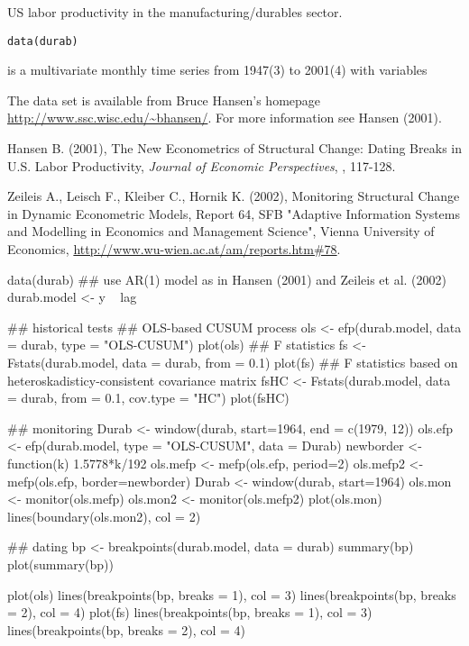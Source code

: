 \begin{Description}\relax
US labor productivity in the manufacturing/durables sector.\end{Description}
\begin{Usage}
\begin{verbatim}data(durab)\end{verbatim}
\end{Usage}
\begin{Format}\relax
{} is a multivariate monthly time series from 1947(3)
to 2001(4) with variables
\end{Format}
\begin{Source}\relax
The data set is available from Bruce Hansen's homepage
\url{http://www.ssc.wisc.edu/~bhansen/}. For more information
see Hansen (2001).\end{Source}
\begin{References}\relax
Hansen B. (2001), The New Econometrics of Structural Change:
Dating Breaks in U.S. Labor Productivity,
\emph{Journal of Economic Perspectives}, , 117-128.

Zeileis A., Leisch F., Kleiber C., Hornik K. (2002), Monitoring
Structural Change in Dynamic Econometric Models,
Report 64, SFB "Adaptive Information Systems and Modelling in Economics
and Management Science", Vienna University of Economics,
\url{http://www.wu-wien.ac.at/am/reports.htm#78}.\end{References}
\begin{Examples}
\begin{ExampleCode}
data(durab)
## use AR(1) model as in Hansen (2001) and Zeileis et al. (2002)
durab.model <- y ~ lag

## historical tests
## OLS-based CUSUM process
ols <- efp(durab.model, data = durab, type = "OLS-CUSUM")
plot(ols)
## F statistics
fs <- Fstats(durab.model, data = durab, from = 0.1)
plot(fs)
## F statistics based on heteroskadisticy-consistent covariance matrix
fsHC <- Fstats(durab.model, data = durab, from = 0.1, cov.type = "HC")
plot(fsHC)

## monitoring
Durab <- window(durab, start=1964, end = c(1979, 12))
ols.efp <- efp(durab.model, type = "OLS-CUSUM", data = Durab)
newborder <- function(k) 1.5778*k/192
ols.mefp <- mefp(ols.efp, period=2)
ols.mefp2 <- mefp(ols.efp, border=newborder)
Durab <- window(durab, start=1964)
ols.mon <- monitor(ols.mefp)
ols.mon2 <- monitor(ols.mefp2)
plot(ols.mon)
lines(boundary(ols.mon2), col = 2)

## dating
bp <- breakpoints(durab.model, data = durab)
summary(bp)
plot(summary(bp))

plot(ols)
lines(breakpoints(bp, breaks = 1), col = 3)
lines(breakpoints(bp, breaks = 2), col = 4)
plot(fs)
lines(breakpoints(bp, breaks = 1), col = 3)
lines(breakpoints(bp, breaks = 2), col = 4)
\end{ExampleCode}
\end{Examples}

